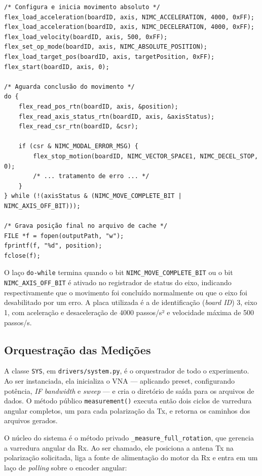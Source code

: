 \documentclass[12pt, a4paper]{article}
\begin{document}
\begin{lstlisting}[style=clang, caption={Laço de espera pelo fim do movimento em \texttt{tx.c}.}]
/* Configura e inicia movimento absoluto */
flex_load_acceleration(boardID, axis, NIMC_ACCELERATION, 4000, 0xFF);
flex_load_acceleration(boardID, axis, NIMC_DECELERATION, 4000, 0xFF);
flex_load_velocity(boardID, axis, 500, 0xFF);
flex_set_op_mode(boardID, axis, NIMC_ABSOLUTE_POSITION);
flex_load_target_pos(boardID, axis, targetPosition, 0xFF);
flex_start(boardID, axis, 0);

/* Aguarda conclusão do movimento */
do {
    flex_read_pos_rtn(boardID, axis, &position);
    flex_read_axis_status_rtn(boardID, axis, &axisStatus);
    flex_read_csr_rtn(boardID, &csr);

    if (csr & NIMC_MODAL_ERROR_MSG) {
        flex_stop_motion(boardID, NIMC_VECTOR_SPACE1, NIMC_DECEL_STOP, 0);
        /* ... tratamento de erro ... */
    }
} while (!(axisStatus & (NIMC_MOVE_COMPLETE_BIT | NIMC_AXIS_OFF_BIT)));

/* Grava posição final no arquivo de cache */
FILE *f = fopen(outputPath, "w");
fprintf(f, "%d", position);
fclose(f);
\end{lstlisting}

O laço \texttt{do-while} termina quando o bit \texttt{NIMC\_MOVE\_COMPLETE\_BIT} ou o bit \texttt{NIMC\_AXIS\_OFF\_BIT} é ativado no registrador de status do eixo, indicando respectivamente que o movimento foi concluído normalmente ou que o eixo foi desabilitado por um erro. A placa utilizada é a de identificação (\textit{board ID}) 3, eixo 1, com aceleração e desaceleração de 4000 passos/s² e velocidade máxima de 500 passos/s.

\subsection{Orquestração das Medições}

A classe \texttt{SYS}, em \texttt{drivers/system.py}, é o orquestrador de todo o experimento. Ao ser instanciada, ela inicializa o VNA --- aplicando preset, configurando potência, \textit{IF bandwidth} e \textit{sweep} --- e cria o diretório de saída para os arquivos de dados. O método público \texttt{measurement()} executa então dois ciclos de varredura angular completos, um para cada polarização da Tx, e retorna os caminhos dos arquivos gerados.

O núcleo do sistema é o método privado \texttt{\_measure\_full\_rotation}, que gerencia a varredura angular da Rx. Ao ser chamado, ele posiciona a antena Tx na polarização solicitada, liga a fonte de alimentação do motor da Rx e entra em um laço de \textit{polling} sobre o encoder angular:
\end{document}
